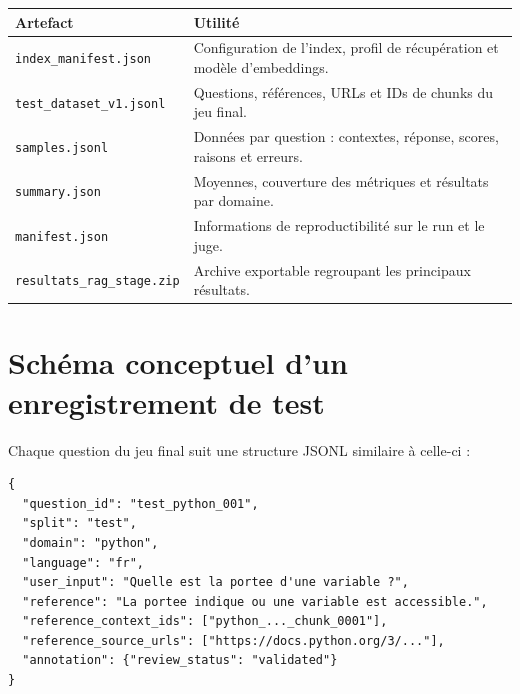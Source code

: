 \documentclass[12pt,a4paper,oneside]{report}
\begin{document}
\begin{longtable}{p{4.2cm}p{10cm}}
\toprule
\textbf{Artefact} & \textbf{Utilité}\\
\midrule
\endhead
\texttt{index\_manifest.json} & Configuration de l'index, profil de récupération et modèle d'embeddings.\\
\texttt{test\_dataset\_v1.\allowbreak jsonl} & Questions, références, URLs et IDs de chunks du jeu final.\\
\texttt{samples.jsonl} & Données par question : contextes, réponse, scores, raisons et erreurs.\\
\texttt{summary.json} & Moyennes, couverture des métriques et résultats par domaine.\\
\texttt{manifest.json} & Informations de reproductibilité sur le run et le juge.\\
\texttt{resultats\_rag\_stage.\allowbreak zip} & Archive exportable regroupant les principaux résultats.\\
\bottomrule
\end{longtable}

\chapter{Schéma conceptuel d'un enregistrement de test}

Chaque question du jeu final suit une structure JSONL similaire à celle-ci :

\begin{lstlisting}[caption={Structure simplifiée d'un enregistrement du jeu de test.}]
{
  "question_id": "test_python_001",
  "split": "test",
  "domain": "python",
  "language": "fr",
  "user_input": "Quelle est la portee d'une variable ?",
  "reference": "La portee indique ou une variable est accessible.",
  "reference_context_ids": ["python_..._chunk_0001"],
  "reference_source_urls": ["https://docs.python.org/3/..."],
  "annotation": {"review_status": "validated"}
}
\end{lstlisting}
\end{document}
